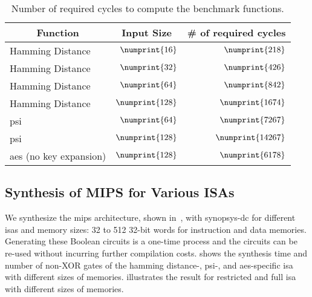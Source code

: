 \begin{table}
\centering
\caption{Number of required cycles to compute the benchmark functions.}\label{tab:cyc_bench}
\begin{tabular}{l||r|r}
\multicolumn{1}{c||}{Function} & \multicolumn{1}{c|}{Input Size} &  \multicolumn{1}{c}{\# of required cycles} \\
\hline
\hline
Hamming Distance & $\numprint{16}$ & $\numprint{218}$\\
\hline
 Hamming Distance & $\numprint{32}$ & $\numprint{426}$\\
\hline
Hamming Distance & $\numprint{64}$ & $\numprint{842}$\\
\hline
Hamming Distance & $\numprint{128}$ & $\numprint{1674}$\\
\hline
\acrshort{psi} & $\numprint{64}$ &$\numprint{7267}$\\
\hline
\acrshort{psi} & $\numprint{128}$ &$\numprint{14267}$\\
\hline
\acrshort{aes} (no key expansion) & $\numprint{128}$ & $\numprint{6178}$\\
\end{tabular}
\end{table}

\subsection{Synthesis of MIPS for Various ISAs}\label{ssect:eval-mips-sfe-isa}
We synthesize the \gls{mips} architecture, shown in~, with \gls{synopsys-dc} for different \acrshort{isa}s and memory sizes: 32 to 512 32-bit words for instruction and data memories.
Generating these Boolean circuits is a one-time process and the circuits can be re-used without incurring further compilation costs.
 shows the synthesis time and number of non-XOR gates of the hamming distance-, \acrshort{psi}-, and \acrshort{aes}-specific \acrshort{isa} with different sizes of memories.
 illustrates the result for restricted and full \acrshort{isa} with different sizes of memories.

